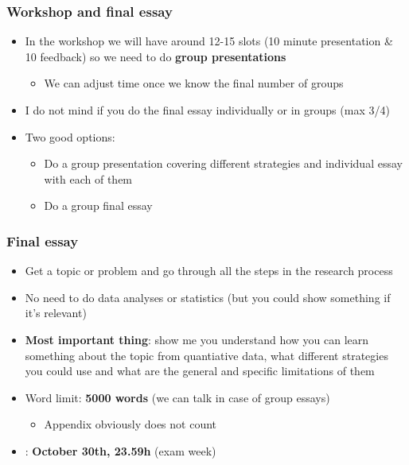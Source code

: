 \documentclass[aspectratio=43]{beamer}
\begin{document}
\begin{frame}
\frametitle{Workshop and final essay}
\centering

\begin{itemize}
  \item In the workshop we will have around 12-15 slots (10 minute presentation \& 10 feedback) so we need to do \textbf{group presentations}
  \begin{itemize}
    \item We can adjust time once we know the final number of groups
  \end{itemize}
  \item I do not mind if you do the final essay individually or in groups (max 3/4)
  \item Two good options:
  \begin{itemize}
    \item Do a group presentation covering different strategies and individual essay with each of them
    \item Do a group final essay
  \end{itemize}
\end{itemize}

\end{frame}

\begin{frame}
\frametitle{Final essay}
\centering

\begin{itemize}
  \item Get a topic or problem and go through all the steps in the research process
  \item No need to do data analyses or statistics (but you could show something if it's relevant)
  \item \textbf{Most important thing}: show me you understand how you can learn something about the topic from quantiative data, what different strategies you could use and what are the general and specific limitations of them
  \item Word limit: \textbf{5000 words} (we can talk in case of group essays)
  \begin{itemize}
    \item Appendix obviously does not count
  \end{itemize}
  \item {\color{red}{Deadline}}: \textbf{October 30th, 23.59h} (exam week)
\end{itemize}

\end{frame}
\end{document}
